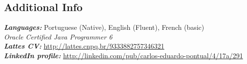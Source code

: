 \documentclass[margin, 10pt]{res} %
\begin{document}
\begin{resume}
\section {Additional Info}
{\sl\bf Languages:} Portuguese (Native), English (Fluent), French (basic) \\
{\sl Oracle Certified Java Programmer 6} \\
{\sl\bf Lattes CV:} \url{http://lattes.cnpq.br/9333882757346321} \\
{\sl\bf LinkedIn profile:} \url{http://linkedin.com/pub/carlos-eduardo-pontual/4/17a/291} \\



\end{resume}
\end{document}
